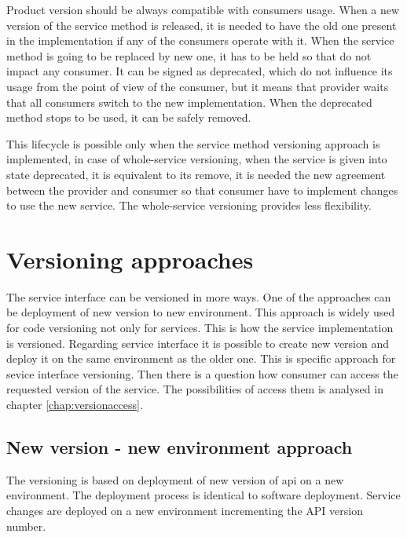 Product version should be always compatible with consumers usage. When a new version of the service method is released, it is needed to have the old one present in the implementation if any of the consumers operate with it. When the service method is going to be replaced by new one, it has to be held so that do not impact any consumer. It can be signed as deprecated, which do not influence its usage from the point of view of the consumer, but it means that provider waits that all consumers switch to the new implementation. When the deprecated method stops to be used, it can be safely removed. 

This lifecycle is possible only when the service method versioning approach is implemented, in case of whole-service versioning, when the service is given into state deprecated, it is equivalent to its remove, it is needed the new agreement between the provider and consumer so that consumer have to implement changes to use the new service. %
The whole-service versioning provides less flexibility.


\section{Versioning approaches}
\label{sec:versioning-approaches}

The service interface can be versioned in more ways. One of the approaches can be deployment of new version to new environment. This approach is widely used for code versioning not only for services. This is how the service implementation is versioned. Regarding service interface it is possible to create new version and deploy it on the same environment as the older one. This is specific approach for sevice interface versioning. Then there is a question how consumer can access the requested version of the service. The possibilities of access them is analysed in chapter \ref{chap:versionaccess}.


\subsection{New version - new environment approach}

The versioning is based on deployment of new version of \gls{api} on a new environment. The deployment process is identical to software deployment. Service changes are deployed on a new environment incrementing the API version number. 

